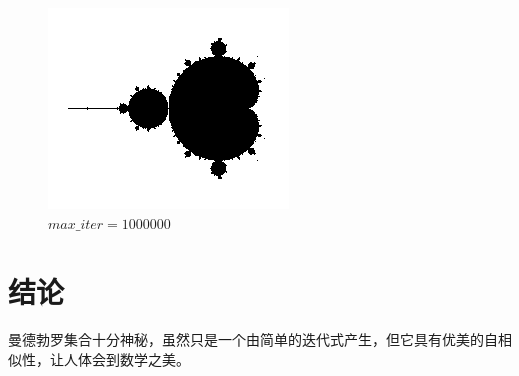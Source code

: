 \documentclass{ctexart}
\begin{document}
\begin{figure}[htbp]
\begin{minipage}{0.45\linewidth}
			\caption{$max\_iter=100$}
			\label{chutian2}%
		\end{minipage}
		\begin{minipage}{0.45\linewidth}
			\centering
			\includegraphics[width=0.62\linewidth]{M_iter_1E6.png}
			\caption{$max\_iter=1000000$}
			\label{chutian2}%
		\end{minipage}
\end{figure}




\section{结论}
曼德勃罗集合十分神秘，虽然只是一个由简单的迭代式产生，但它具有优美的自相似性，让人体会到数学之美。



\end{document}
